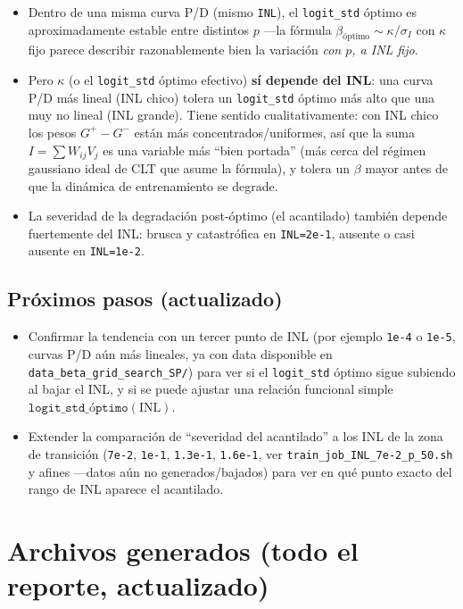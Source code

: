 \documentclass[11pt]{article}
\begin{document}
\begin{itemize}
\item Dentro de una misma curva P/D (mismo \texttt{INL}), el
  \texttt{logit\_std} óptimo es aproximadamente estable entre distintos
  $p$ —la fórmula $\beta_{\text{óptimo}}\sim\kappa/\sigma_I$ con $\kappa$
  fijo parece describir razonablemente bien la variación \emph{con $p$, a
  INL fijo}.
\item Pero $\kappa$ (o el \texttt{logit\_std} óptimo efectivo) \textbf{sí
  depende del INL}: una curva P/D más lineal (INL chico) tolera un
  \texttt{logit\_std} óptimo más alto que una muy no lineal (INL grande).
  Tiene sentido cualitativamente: con INL chico los pesos $G^+-G^-$ están
  más concentrados/uniformes, así que la suma $I=\sum W_{ij}V_j$ es una
  variable más ``bien portada'' (más cerca del régimen gaussiano ideal de
  CLT que asume la fórmula), y tolera un $\beta$ mayor antes de que la
  dinámica de entrenamiento se degrade.
\item La severidad de la degradación post-óptimo (el acantilado) también
  depende fuertemente del INL: brusca y catastrófica en \texttt{INL=2e-1},
  ausente o casi ausente en \texttt{INL=1e-2}.
\end{itemize}

\subsection{Próximos pasos (actualizado)}

\begin{itemize}
\item Confirmar la tendencia con un tercer punto de INL (por ejemplo
  \texttt{1e-4} o \texttt{1e-5}, curvas P/D aún más lineales, ya con data
  disponible en \texttt{data\_beta\_grid\_search\_SP/}) para ver si el
  \texttt{logit\_std} óptimo sigue subiendo al bajar el INL, y si se puede
  ajustar una relación funcional simple $\texttt{logit\_std\_óptimo}(\text{INL})$.
\item Extender la comparación de ``severidad del acantilado'' a los INL de
  la zona de transición (\texttt{7e-2}, \texttt{1e-1}, \texttt{1.3e-1},
  \texttt{1.6e-1}, ver \texttt{train\_job\_INL\_7e-2\_p\_50.sh} y afines
  —datos aún no generados/bajados) para ver en qué punto exacto del rango
  de INL aparece el acantilado.
\end{itemize}

\section{Archivos generados (todo el reporte, actualizado)}
\end{document}
